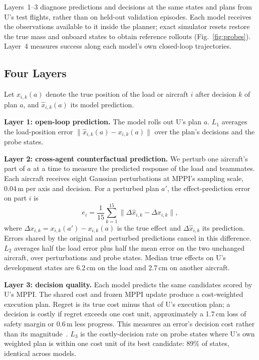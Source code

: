 \documentclass[conference]{IEEEtran}
\begin{document}
Layers~1--3 diagnose predictions and decisions at the same states and plans from U's test flights, rather than on held-out validation episodes. Each model receives the observations available to it inside the planner; exact simulator resets restore the true mass and onboard states to obtain reference rollouts (Fig.~\ref{fig:probes}). Layer~4 measures success along each model's own closed-loop trajectories.

\subsection{Four Layers}\label{sec:fourlayers}
Let $x_{i,k}(a)$ denote the true position of the load or aircraft $i$ after decision $k$ of plan $a$, and $\hat{x}_{i,k}(a)$ its model prediction.

\textbf{Layer 1: open-loop prediction.} The model rolls out U's plan $a$. $L_1$ averages the load-position error $\|\hat{x}_{i,k}(a)-x_{i,k}(a)\|$ over the plan's decisions and the probe states.

\textbf{Layer 2: cross-agent counterfactual prediction.} We perturb one aircraft's part of $a$ at a time to measure the predicted response of the load and teammates. Each aircraft receives eight Gaussian perturbations at MPPI's sampling scale, 0.04\,m per axis and decision. For a perturbed plan $a'$, the effect-prediction error on part $i$ is
\begin{equation}
e_i = \frac{1}{15}\sum_{k=1}^{15}\bigl\|\Delta\hat{x}_{i,k} - \Delta x_{i,k}\bigr\|,
\label{eq:cee}
\end{equation}
where $\Delta x_{i,k}=x_{i,k}(a')-x_{i,k}(a)$ is the true effect and $\Delta\hat{x}_{i,k}$ its prediction. Errors shared by the original and perturbed predictions cancel in this difference. $L_2$ averages half the load error plus half the mean error on the two unchanged aircraft, over perturbations and probe states. Median true effects on U's development states are 6.2\,cm on the load and 2.7\,cm on another aircraft.

\textbf{Layer 3: decision quality.} Each model predicts the same candidates scored by U's MPPI. The shared cost and frozen MPPI update produce a cost-weighted execution plan. Regret is its true cost minus that of U's execution plan; a decision is costly if regret exceeds one cost unit, approximately a 1.7\,cm loss of safety margin or 0.6\,m less progress. This measures an error's decision cost rather than its magnitude~\cite{grimm2020value}. $L_3$ is the costly-decision rate on probe states where U's own weighted plan is within one cost unit of its best candidate: 89\% of states, identical across models.
\end{document}
